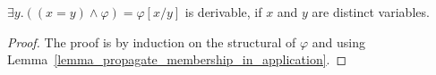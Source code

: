 \documentclass{amsart}
\begin{document}
\begin{comment}
\begin{lemma}
\label{lemma_definedness_lemma_C}
For any pattern set $\Gamma$,
any symbol $\sigma$,
and any pattern $\varphi$,
$\Gamma \vdash (x = y) \wedge \Csigmaapp{\varphi}
= \Csigmaapp{(x = y) \wedge \varphi }$,
if $x$ and $y$ are distinct, and $x$ does not occur free in $\varphi$.
\end{lemma}
\begin{proof}
Just use Lemma~\ref{lemma_propagate_membership_in_application}.

We first show
$\Gamma \vdash \Csigmaapp{(x = y) \wedge \varphi } \imp (x = y) \wedge 
\Csigmaapp{\varphi}$.
In fact, it follows immediately from \framing and
FOL reasoning.
We now show
$\Gamma \vdash (x = y) \wedge \Csigmaapp{\varphi}
\imp \Csigmaapp{(x = y) \wedge \varphi }$
\todo[inline]{Finish this proof.}
\end{proof}
\end{comment}

\begin{lemma}
\label{lemma_equality_lemma_A}
$\exists y . ((x = y)\wedge \varphi) = \varphi[x/y] $
is derivable,
if $x$ and $y$ are distinct variables.
\end{lemma}
\begin{proof}\quad
The proof is by induction on the structural of $\varphi$
and using Lemma~\ref{lemma_propagate_membership_in_application}.
\end{proof}

\begin{comment}

\begin{lemma}
\label{lemma_definedness_lemma_A}
For any pattern set $\Gamma$ and pattern $\varphi$,
$\Gamma \vdash 
  \ceil{ x \wedge \ceil{y \wedge \varphi}} = \ceil{ y \wedge \varphi }$, 
  where $x$ and $y$ are not necessarily distinct.
\end{lemma}
\begin{proof}
We first prove
$\Gamma \vdash
  \ceil{ y \wedge \varphi } \imp 
  \ceil{ x \wedge \ceil{y \wedge \varphi}}$,
which follows directly from \framing and FOL reasoning,
and the fact that 
$\Gamma \vdash (y \wedge \varphi) \imp \ceil{y \wedge \varphi}$
by Lemma~\ref{lemma_P_implies_ceil_P}.
We now prove
$\Gamma \vdash 
  \ceil{ x \wedge \ceil{y \wedge \varphi}} \imp \ceil{ y \wedge \varphi }$.
\todo[inline]{Finish this proof.}
\end{proof}

\end{comment}
\end{document}
